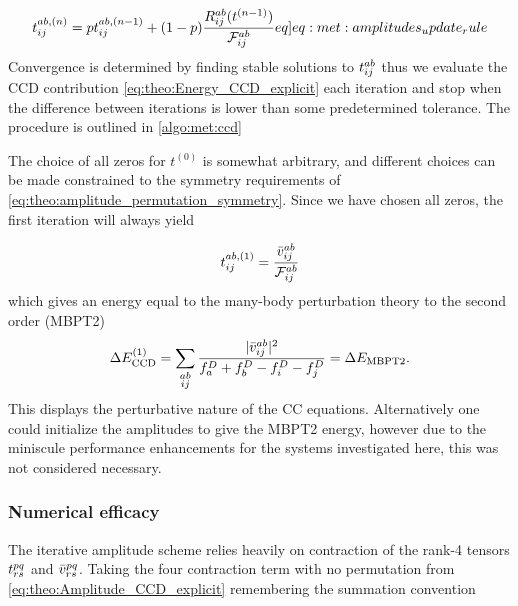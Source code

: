 \begin{align}
    \amplitude{ab,(n)}{ij} = p\amplitude{ab,(n-1)}{ij} + (1-p)\frac{R^{ab}_{ij}(t^{(n-1)})}{\mathcal{F}^{ab}_{ij}} \label[eq]{eq:met:amplitudes_update_rule}
\end{align}
Convergence is determined by finding stable solutions to $t^{ab}_{ij}$ thus we evaluate the CCD contribution \cref{eq:theo:Energy_CCD_explicit} each iteration and stop when the difference between iterations is lower than some predetermined tolerance. The procedure is outlined in \cref{algo:met:ccd}

The choice of all zeros for $t^{(0)}$ is somewhat arbitrary, and different choices can be made constrained to the symmetry requirements of \cref{eq:theo:amplitude_permutation_symmetry}. Since we have chosen all zeros, the first iteration will always yield

\begin{align*}
    t^{ab,(1)}_{ij} = \frac{\bar{v}^{ab}_{ij}}{\mathcal{F}^{ab}_{ij}}
\end{align*}
which gives an energy equal to the many-body perturbation theory to the second order (MBPT2)
\begin{align*}
    \Delta E_{\text{CCD}}^{(1)} = \sum_{\substack{ab\\ij}} \frac{|\bar{v}^{ab}_{ij}|^2}{f_a^D + f_b^D -f_i^D - f_j^D} = \Delta E_{\text{MBPT2}}.
\end{align*} 
This displays the perturbative nature of the CC equations. Alternatively one could initialize the amplitudes to give the MBPT2 energy, however due to the miniscule performance enhancements for the systems investigated here, this was not considered necessary.   
\subsubsection{Numerical efficacy}
The iterative amplitude scheme relies heavily on contraction of the rank-4 tensors $t^{pq}_{rs}$ and $\bar{v}^{pq}_{rs}$. Taking the four contraction term with no permutation from \cref{eq:theo:Amplitude_CCD_explicit} remembering the summation convention

